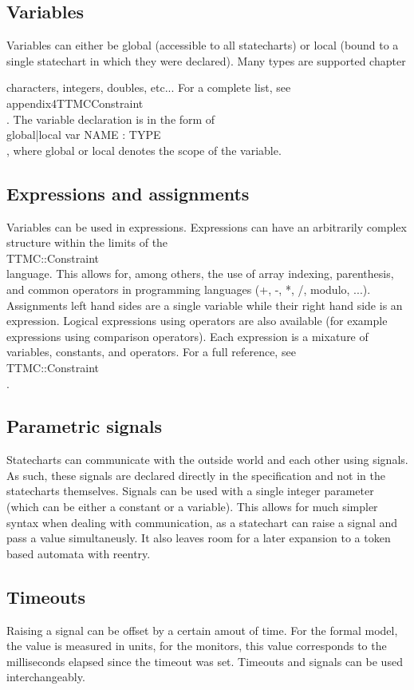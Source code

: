   \subsection{Variables}
Variables can either be global (accessible to all statecharts) or local (bound to a single statechart in which they were declared). Many types are supported chapter{ characters, integers, doubles, etc... For a complete list, see \\appendix4TTMCConstraint\\. The variable declaration is in the form of \\global|local var NAME : TYPE\\, where global or local denotes the scope of the variable.
  \subsection{Expressions and assignments}
Variables can be used in expressions. Expressions can have an arbitrarily complex structure within the limits of the \\TTMC::Constraint\\ language. This allows for, among others, the use of array indexing, parenthesis, and common operators in programming languages (+, -, *, /, modulo, ...). Assignments left hand sides are a single variable while their right hand side is an expression. Logical expressions using operators are also available (for example expressions using comparison operators). Each expression is a mixature of variables, constants, and operators. For a full reference, see \\TTMC::Constraint\\.
  \subsection{Parametric signals}
Statecharts can communicate with the outside world and each other using signals. As such, these signals are declared directly in the specification and not in the statecharts themselves. Signals can be used with a single integer parameter (which can be either a constant or a variable). This allows for much simpler syntax when dealing with communication, as a statechart can raise a signal and pass a value simultaneusly. It also leaves room for a later expansion to a token based automata with reentry.
  \subsection{Timeouts}
Raising a signal can be offset by a certain amout of time. For the formal model, the value is measured in units, for the monitors, this value corresponds to the milliseconds elapsed since the timeout was set. Timeouts and signals can be used interchangeably.
}
